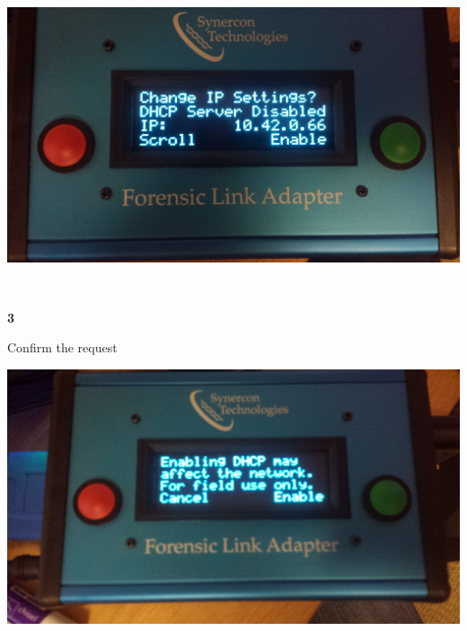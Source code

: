 \documentclass[11pt]{article}
\begin{document}
\hfill%
\begin{minipage}{0.6\textwidth}
\includegraphics[width=\linewidth]{../media/fla_screens/sys_conf_dhcp_diss}
\end{minipage}
\\[\baselineskip]
\noindent\begin{minipage}{0.3\textwidth}%
\begin{center}
\textbf{3}\\[\baselineskip]
\end{center}
Confirm the request
\end{minipage}%
\hfill%
\begin{minipage}{0.6\textwidth}
\includegraphics[width=\linewidth]{../media/fla_screens/sys_conf_dhcp_conf_enable}
\end{minipage}
\end{document}
